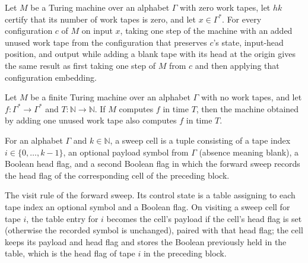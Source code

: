 \begin{lemma}
\label{Turing.FinTM.unusedTape_step}
\leanok
{}
Let $M$ be a Turing machine over an alphabet $\Gamma$ with zero work tapes, let $hk$
certify that its number of work tapes is zero, and let $x\in\Gamma^*$. For every
configuration $c$ of $M$ on input $x$, taking one step of the machine with an added
unused work tape from the configuration that preserves $c$'s state, input-head position,
and output while adding a blank tape with its head at the origin gives the same result
as first taking one step of $M$ from $c$ and then applying that configuration embedding.
\end{lemma}

\begin{lemma}
\label{Turing.FinTM.unusedTape_computes}
\leanok
{}
Let $M$ be a finite Turing machine over an alphabet $\Gamma$ with no work tapes, and let
$f\colon\Gamma^*\to\Gamma^*$ and $T\colon\mathbb{N}\to\mathbb{N}$. If $M$ computes $f$
in time $T$, then the machine obtained by adding one unused work tape also computes $f$
in time $T$.
\end{lemma}

\begin{definition}
\label{Turing.FinTM.SweepCell}
\leanok
For an alphabet $\Gamma$ and $k \in \mathbb{N}$, a sweep cell is a tuple consisting of a
tape index $i \in \{0, \dots, k-1\}$, an optional payload symbol from $\Gamma$ (absence
meaning blank), a Boolean head flag, and a second Boolean flag in which the forward
sweep records the head flag of the corresponding cell of the preceding block.
\end{definition}

\begin{definition}
\label{Turing.FinTM.readVisit}
\leanok
{}
The visit rule of the forward sweep. Its control state is a table assigning to each tape
index an optional symbol and a Boolean flag. On visiting a sweep cell for tape $i$, the
table entry for $i$ becomes the cell's payload if the cell's head flag is set (otherwise
the recorded symbol is unchanged), paired with that head flag; the cell keeps its
payload and head flag and stores the Boolean previously held in the table, which is the
head flag of tape $i$ in the preceding block.
\end{definition}

